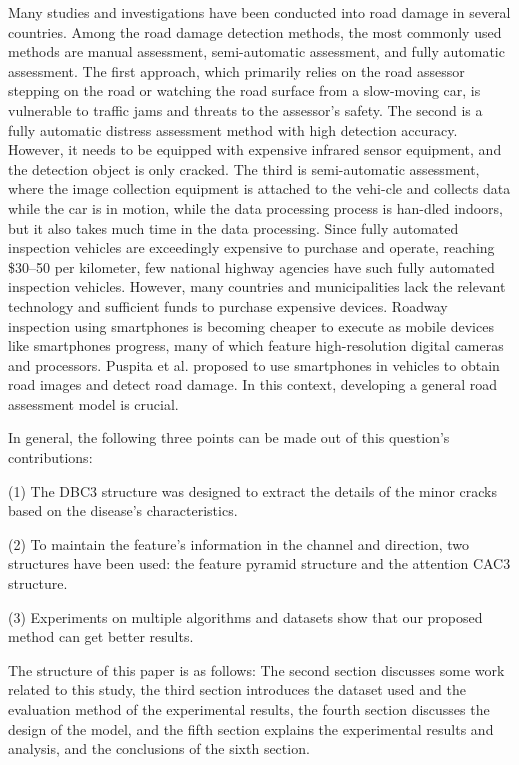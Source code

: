 \documentclass[sensors,article,submit,moreauthors]{Definitions/mdpi}
\begin{document}
    Many studies and investigations have been conducted into road damage in several countries\citep{miller2009crash}. Among the road damage detection methods, the most commonly used methods are manual assessment\citep{chatterjee2018fast}, semi-automatic assessment\citep{shim2022road}, and fully automatic assessment\citep{liang2022automatic}. The first approach, which primarily relies on the road assessor stepping on the road or watching the road surface from a slow-moving car, is vulnerable to traffic jams and threats to the assessor's safety. The second is a fully automatic distress assessment method with high detection accuracy. However, it needs to be equipped with expensive infrared sensor equipment, and the detection object is only cracked. The third is semi-automatic assessment, where the image collection equipment is attached to the vehi-cle and collects data while the car is in motion, while the data processing process is han-dled indoors, but it also takes much time in the data processing. Since fully automated inspection vehicles are exceedingly expensive to purchase and operate, reaching \$30--50 per kilometer\citep{radopoulou2015detection}, few national highway agencies have such fully automated inspection vehicles. However, many countries and municipalities lack the relevant technology and sufficient funds to purchase expensive devices. Roadway inspection using smartphones is becoming cheaper to execute as mobile devices like smartphones progress, many of which feature high-resolution digital cameras and processors. Puspita et al.\citep{puspita2022road} proposed to use smartphones in vehicles to obtain road images and detect road damage. In this context, developing a general road assessment model is crucial.

    In general, the following three points can be made out of this question's contributions:

    (1) The DBC3 structure was designed to extract the details of the minor cracks based on the disease's characteristics.

    (2) To maintain the feature's information in the channel and direction, two structures have been used: the feature pyramid structure and the attention CAC3 structure.

    (3) Experiments on multiple algorithms and datasets show that our proposed method can get better results.

    The structure of this paper is as follows: The second section discusses some work related to this study, the third section introduces the dataset used and the evaluation method of the experimental results, the fourth section discusses the design of the model, and the fifth section explains the experimental results and analysis, and the conclusions of the sixth section.
\end{document}
